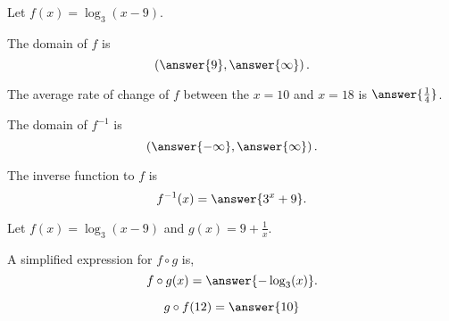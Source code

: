 \documentclass{ximera}
\author{Nela Lakos \and Kyle Parsons}
\begin{document}
\begin{exercise}

Let $\displaystyle{f(x) = \log_3(x-9)}$.

The domain of $f$ is
\[
\left(\answer{9},\answer{\infty}\right).
\]

The average rate of change of $f$ between the $x=10$ and $x=18$ is $\answer{\frac{1}{4}}$.

The domain of $f^{-1}$ is
\[
\left(\answer{-\infty},\answer{\infty}\right).
\]

The inverse function to $f$ is 
\[
f^{-1}(x) = \answer{3^x + 9}.
\]

\begin{exercise}

Let $f(x) = \log_3(x-9)$ and $g(x) = 9 + \frac{1}{x}$.

A simplified expression for $f\circ g$ is,
\[
f\circ g(x) = \answer{-\log_3(x)}.
\]

\[
g\circ f(12) = \answer{10}
\]

\end{exercise}
\end{exercise}
\end{document}
